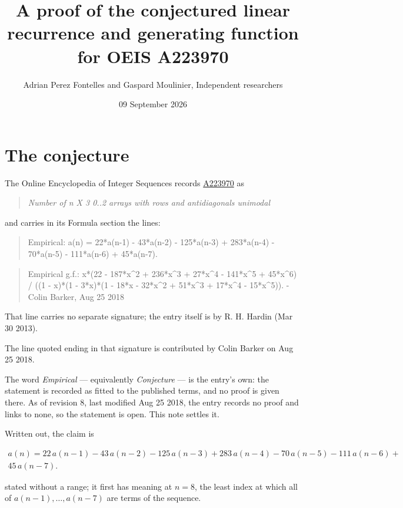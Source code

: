 \documentclass[11pt]{article}
\title{A proof of the conjectured linear recurrence and generating function for OEIS A223970}
\author{Adrian Perez Fontelles and Gaspard Moulinier, Independent researchers}
\date{09 September 2026}
\theoremstyle{definition}
\begin{document}
\maketitle
\section{The conjecture}

The Online Encyclopedia of Integer Sequences records \href{https://oeis.org/A223970}{A223970} as

\begin{quote}\itshape Number of n X 3 0..2 arrays with rows and antidiagonals unimodal\end{quote}

and carries in its Formula section the lines:

\begin{quote}\ttfamily Empirical: a(n) = 22*a(n-1) - 43*a(n-2) - 125*a(n-3) + 283*a(n-4) - 70*a(n-5) - 111*a(n-6) + 45*a(n-7).\end{quote}

\begin{quote}\ttfamily Empirical g.f.: x*(22 - 187*x\textasciicircum{}2 + 236*x\textasciicircum{}3 + 27*x\textasciicircum{}4 - 141*x\textasciicircum{}5 + 45*x\textasciicircum{}6) / ((1 - x)*(1 - 3*x)*(1 - 18*x - 32*x\textasciicircum{}2 + 51*x\textasciicircum{}3 + 17*x\textasciicircum{}4 - 15*x\textasciicircum{}5)). - Colin Barker, Aug 25 2018\end{quote}

That line carries no separate signature; the entry itself is by R. H. Hardin (Mar 30 2013).

The line quoted ending in that signature is contributed by Colin Barker on Aug 25 2018.

The word {\itshape Empirical} --- equivalently {\itshape Conjecture} --- is the entry's own: the statement is recorded as fitted to the published terms, and no proof is given there. As of revision 8, last modified Aug 25 2018, the entry records no proof and links to none, so the statement is open. This note settles it.

Written out, the claim is

\begin{multline*} a(n) = 22\,a(n-1) - 43\,a(n-2) - 125\,a(n-3) + 283\,a(n-4) - 70\,a(n-5) - 111\,a(n-6) + \\ 45\,a(n-7). \end{multline*}

stated without a range; it first has meaning at $n = 8$, the least index at which all of $a(n-1),\dots,a(n-7)$ are terms of the sequence.
\end{document}
